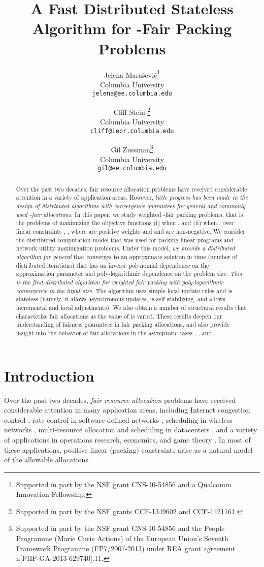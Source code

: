 \documentclass[11pt]{article}
\title{{A Fast Distributed Stateless Algorithm for -Fair Packing Problems}}
\author{
Jelena Mara\v{s}evi\'{c}\thanks{Supported in part by the NSF grant CNS-10-54856 and a Qualcomm Innovation Fellowship.}\\ 
Columbia University\\
{\tt jelena@ee.columbia.edu}\\
\and
Cliff Stein \thanks{Supported in part by the NSF grants CCF-1349602 and CCF-1421161.}\\
{Columbia University}\\
{\tt cliff@ieor.columbia.edu}\\
\and
Gil Zussman\thanks{Supported in part by the NSF grant CNS-10-54856 and the People Programme (Marie Curie Actions) of the European Union's Seventh Framework Programme (FP7/2007-2013) under REA grant agreement n[PIIF-GA-2013-629740].11.}\\
{Columbia University}\\
{\tt gil@ee.columbia.edu}
}
\date{}
\begin{document}
\maketitle
\begin{abstract}
Over the past two decades, fair resource allocation problems have received considerable attention in a variety of application areas. However, \emph{little progress has been made in the design of distributed algorithms with convergence guarantees for general and commonly used -fair allocations}.  In this paper, we study weighted -fair packing problems, that is, the problems of maximizing the objective functions (i)  when ,  and (ii)  when , over linear constraints , , where  are positive weights and  and  are non-negative. We consider the distributed computation model that was used for packing linear programs and network utility maximization problems. Under this model, \emph{we provide a distributed algorithm for general } that converges to an approximate solution in time (number of distributed iterations) that has an inverse polynomial dependence on the approximation parameter  and poly-logarithmic dependence on the problem size. \emph{This is the first distributed algorithm for weighted fair packing with poly-logarithmic convergence in the input size.} The algorithm uses simple local update rules and is stateless (namely,  it allows asynchronous updates, is self-stabilizing, and allows incremental and local adjustments). We also obtain a number of structural results that characterize fair allocations as the value of  is varied. These results deepen our understanding of fairness guarantees in fair packing allocations, and also provide insight into the behavior of fair allocations in the asymptotic cases , , and .  
\end{abstract}


\thispagestyle{empty}
\newpage



\section{Introduction}\label{section:intro}
\setcounter{page}{1}
\pagestyle{plain}

Over the past two decades, \emph{fair resource allocation} problems have received considerable attention in many  application areas, including  Internet congestion control \cite{low2002internet}, rate control in software defined networks \cite{mccormick2014real}, scheduling in wireless networks \cite{yi2008stochastic}, {multi-resource allocation and scheduling in datacenters} \cite{bonald2015multi, ghodsi2011dominant, joe2013multiresource, Im2014competitive}, and a variety of applications in operations research,  economics, and game theory
\cite{bertsimas2012efficiency, jain2007eisenberg}. In most of these applications, positive linear (packing) constraints arise as a natural model of the allowable allocations. 
\end{document}

